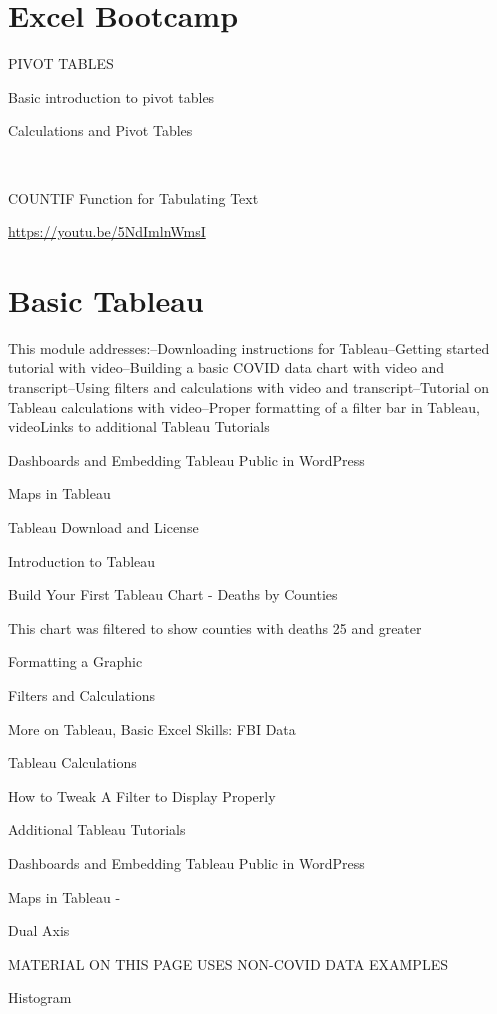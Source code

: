 \documentclass[]{book}
\begin{document}
\hypertarget{excel-bootcamp}{%
\chapter{Excel Bootcamp}\label{excel-bootcamp}}

PIVOT TABLES

Basic introduction to pivot tables

Calculations and Pivot Tables

~

COUNTIF Function for Tabulating Text

\url{https://youtu.be/5NdImlnWmsI}

\hypertarget{basic-tableau}{%
\chapter{Basic Tableau}\label{basic-tableau}}

This module addresses:--Downloading instructions for Tableau--Getting started tutorial with video--Building a basic COVID data chart with video and transcript--Using filters and calculations with video and transcript--Tutorial on Tableau calculations with video--Proper formatting of a filter bar in Tableau, videoLinks to additional Tableau Tutorials

Dashboards and Embedding Tableau Public in WordPress

Maps in Tableau

Tableau Download and License

Introduction to Tableau

Build Your First Tableau Chart - Deaths by Counties

This chart was filtered to show counties with deaths 25 and greater

Formatting a Graphic

Filters and Calculations

More on Tableau, Basic Excel Skills: FBI Data

Tableau Calculations

How to Tweak A Filter to Display Properly

Additional Tableau Tutorials

Dashboards and Embedding Tableau Public in WordPress

Maps in Tableau -

Dual Axis

MATERIAL ON THIS PAGE USES NON-COVID DATA EXAMPLES

Histogram
\end{document}

